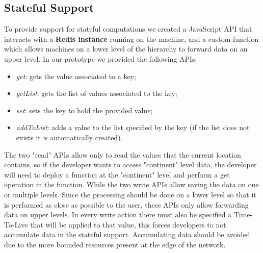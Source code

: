 \subsection{Stateful Support}
To provide support for stateful computations we created a JavaScript API that interacts with a \textbf{Redis instance} running on the machine, and a custom function which allows machines on a lower level of the hierarchy to forward data on an upper level.
In our prototype we provided the following APIs:
\begin{itemize}
    \item \textit{get}: gets the value associated to a key;
    \item \textit{getList}: gets the list of values associated to the key;
    \item \textit{set}: sets the key to hold the provided value;
    \item \textit{addToList}: adds a value to the list specified by the key (if the list does not exists it is automatically created).
\end{itemize}
The two "read" APIs allow only to read the values that the current location contains, so if the developer wants to access "continent" level data, the developer will need to deploy a function at the "continent" level and perform a get operation in the function. 
While the two write APIs allow saving the data on one or multiple levels. Since the processing should be done on a lower level so that it is performed as close as possible to the user, these APIs only allow forwarding data on upper levels. In every write action there must also be specified a Time-To-Live that will be applied to that value, this forces developers to not accumulate data in the stateful support. Accumulating data should be avoided due to the more bounded resources present at the edge of the network.
